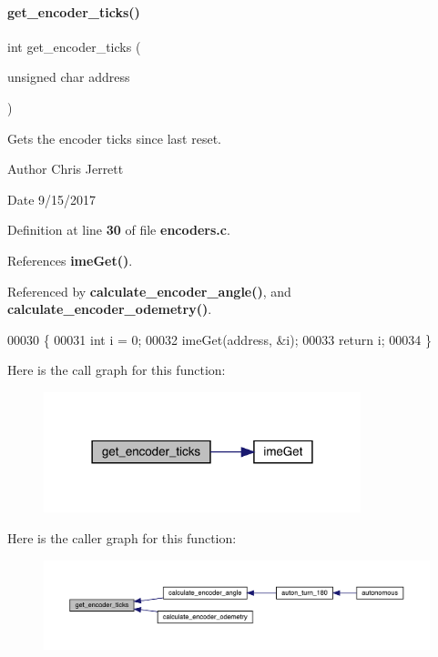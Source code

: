 \paragraph{get\+\_\+encoder\+\_\+ticks()}
{\footnotesize\ttfamily int get\+\_\+encoder\+\_\+ticks (\begin{DoxyParamCaption}\item[{unsigned char}]{address }\end{DoxyParamCaption})}



Gets the encoder ticks since last reset. 

\begin{DoxyAuthor}{Author}
Chris Jerrett 
\end{DoxyAuthor}
\begin{DoxyDate}{Date}
9/15/2017 
\end{DoxyDate}


Definition at line \textbf{ 30} of file \textbf{ encoders.\+c}.



References \textbf{ ime\+Get()}.



Referenced by \textbf{ calculate\+\_\+encoder\+\_\+angle()}, and \textbf{ calculate\+\_\+encoder\+\_\+odemetry()}.


\begin{DoxyCode}
00030                                              \{
00031   \textcolor{keywordtype}{int} i = 0;
00032   imeGet(address, &i);
00033   \textcolor{keywordflow}{return} i;
00034 \}
\end{DoxyCode}
Here is the call graph for this function\+:
\nopagebreak
\begin{figure}[H]
\begin{center}
\leavevmode
\includegraphics[width=261pt]{encoders_8h_aed261dd4dae33a48c42f2e363c84760f_cgraph}
\end{center}
\end{figure}
Here is the caller graph for this function\+:
\nopagebreak
\begin{figure}[H]
\begin{center}
\leavevmode
\includegraphics[width=350pt]{encoders_8h_aed261dd4dae33a48c42f2e363c84760f_icgraph}
\end{center}
\end{figure}
\mbox{\label{encoders_8h_a8e6b77703c5cf18e00709b052fb4bf22}} 
